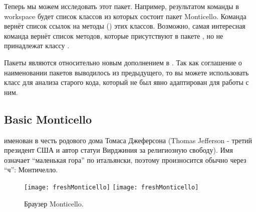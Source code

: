 \documentclass[a4paper,10pt,twoside]{book}
\begin{document}
Теперь мы можем исследовать этот пакет. Например, результатом команды  в workspace будет список классов из которых состоит пакет Monticello. Команда  вернёт список ссылок на методы () этих классов. Возможно, самая интересная команда  вернёт  список методов, которые присутствуют в пакете , но не принадлежат классу .


Пакеты являются относительно новым дополнением в \pharo. Так как соглашение о наименовании пакетов выводилось из предыдущего, то вы можете использовать класс  для анализа старого кода, который не был явно адаптирован для работы с ним.



\subsection{Basic Monticello}


 именован в честь родового дома Томаса Джеферсона (Thomas Jefferson - третий президент США и автор статуи Вирджиния за религиозную свободу). Имя означает ``маленькая гора'' по итальянски, поэтому произносится обычно через ``ч'': Монтичелло.

\begin{figure}[btp]
	\begin{center}
	\ifluluelse
		{\texttt{[image: freshMonticello]}}
		{\texttt{[image: freshMonticello]}}
	\end{center}
	\caption{Браузер Monticello.}
\end{figure}
\end{document}
